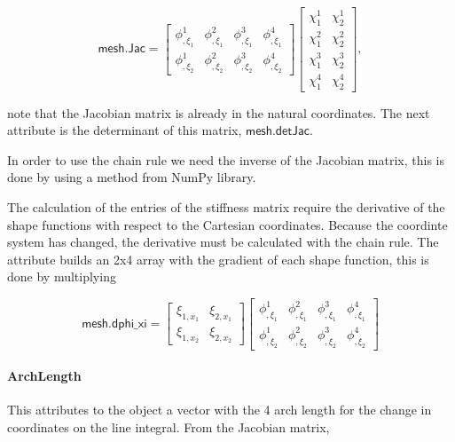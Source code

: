 \documentclass[10pt, a4paper]{article}
\begin{document}
\begin{equation*}
\mathsf{mesh.Jac} = \begin{bmatrix}
\phi^1_{,\xi_1} & \phi^2_{,\xi_1} & \phi^3_{,\xi_1} & \phi^4_{,\xi_1} \\[.2cm]
\phi^1_{,\xi_2} & \phi^2_{,\xi_2} & \phi^3_{,\xi_2} & \phi^4_{,\xi_2}
\end{bmatrix}
\begin{bmatrix}
\chi^1_1 & \chi^1_2 \\[.2cm]
\chi^2_1 & \chi^2_2 \\[.2cm]
\chi^3_1 & \chi^3_2 \\[.2cm]
\chi^4_1 & \chi^4_2 
\end{bmatrix},
\end{equation*} 

note that the Jacobian matrix is already in the natural coordinates. The next attribute is the determinant of this matrix, $\textsf{mesh.detJac}$. 

In order to use the chain rule we need the inverse of the Jacobian matrix, this is done by using a method from \textsf{NumPy} library.

The calculation of the entries of the stiffness matrix require the derivative of the shape functions with respect to the Cartesian coordinates. Because the coordinte system has changed, the derivative must be calculated with the chain rule. The attribute builds an 2x4 array with the gradient of each shape function, this is done by multiplying

\begin{equation*}
\textsf{mesh.dphi}\_\textsf{xi} = \begin{bmatrix}
\xi_{1,x_1} & \xi_{2,x_1} \\[.2cm]
\xi_{1,x_2} & \xi_{2,x_2}
\end{bmatrix}
 \begin{bmatrix}
\phi^1_{,\xi_1} & \phi^2_{,\xi_1} & \phi^3_{,\xi_1} & \phi^4_{,\xi_1} \\[.2cm]
\phi^1_{,\xi_2} & \phi^2_{,\xi_2} & \phi^3_{,\xi_2} & \phi^4_{,\xi_2}
\end{bmatrix}
\end{equation*}

\paragraph{\textsf{ArchLength}}

This attributes to the object a vector with the 4 arch length for the change in coordinates on the line integral. From the Jacobian matrix,
\end{document}
